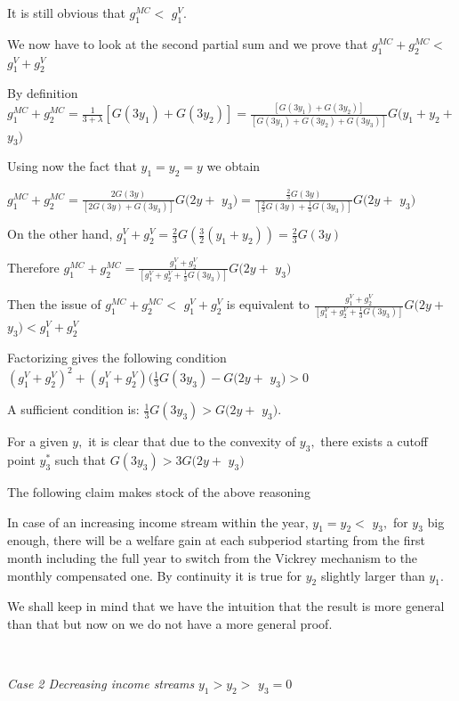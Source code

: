 It is still obvious that $g_{1}^{MC}<$ $g_{1}^{V}.\ $

We now have to look at the second partial sum and we prove that $g_{1}%
^{MC}+g_{2}^{MC}<$ $g_{1}^{V}+g_{2}^{V}$

By definition $g_{1}^{MC}+g_{2}^{MC}=\frac{1}{3+\lambda}[G(3y_{1}%
)+G(3y_{2})]=\frac{[G(3y_{1})+G(3y_{2})]}{[G(3y_{1})+G(3y_{2})+G(3y_{3}%
)]}G(y_{1}+y_{2}+$ $y_{3})$

Using now the fact that $y_{1}=y_{2}=y$ we obtain

$g_{1}^{MC}+g_{2}^{MC}=\frac{2G(3y)}{[2G(3y)+G(3y_{3})]}G(2y+$ $y_{3}%
)=\frac{\frac{2}{3}G(3y)}{[\frac{2}{3}G(3y)+\frac{1}{3}G(3y_{3})]}G(2y+$
$y_{3})$

On the other hand, $g_{1}^{V}+g_{2}^{V}=\frac{2}{3}G(\frac{3}{2}(y_{1}%
+y_{2}))=\frac{2}{3}G(3y)$

Therefore $g_{1}^{MC}+g_{2}^{MC}=\frac{g_{1}^{V}+g_{2}^{V}}{[g_{1}^{V}%
+g_{2}^{V}+\frac{1}{3}G(3y_{3})]}G(2y+$ $y_{3})$

Then the issue of $g_{1}^{MC}+g_{2}^{MC}<$ $g_{1}^{V}+g_{2}^{V}$ is equivalent
to $\frac{g_{1}^{V}+g_{2}^{V}}{[g_{1}^{V}+g_{2}^{V}+\frac{1}{3}G(3y_{3}%
)]}G(2y+$ $y_{3})<g_{1}^{V}+g_{2}^{V}$

Factorizing gives the following condition $(g_{1}^{V}+g_{2}^{V})^{2}%
+(g_{1}^{V}+g_{2}^{V})(\frac{1}{3}G(3y_{3})-G(2y+$ $y_{3})>0$

A sufficient condition is: $\frac{1}{3}G(3y_{3})>G(2y+$ $y_{3}).$

For a given $y,$ it is clear that due to the convexity of $y_{3},$ there
exists a cutoff point $y_{3}^{\ast}$ such that $G(3y_{3})>3G(2y+$ $y_{3})$

The following claim makes stock of the above reasoning

\begin{claim}
In case of an increasing income stream within the year, $y_{1}=y_{2}<$
$y_{3},$ for $y_{3}$ big enough, there will be a welfare gain at each
subperiod starting from the first month including the full year to switch from
the Vickrey mechanism to the monthly compensated one. By continuity it is true
for $y_{2}$ slightly larger than $y_{1}.$
\end{claim}

We shall keep in mind that we have the intuition that the result is more
general than that but now on we do not have a more general proof.

\ 

\textit{Case 2 Decreasing income streams }$y_{1}>y_{2}>$ $y_{3}=0$

